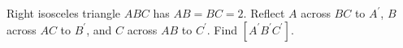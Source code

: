 Right isosceles triangle $ABC$ has $AB=BC=2$. Reflect $A$ across $BC$ to $A^{\prime}$, $B$ across $AC$ to $B^{\prime}$, and $C$ across $AB$ to $C^{\prime}$. Find $[A^{\prime} B^{\prime} C^{\prime}]$.

